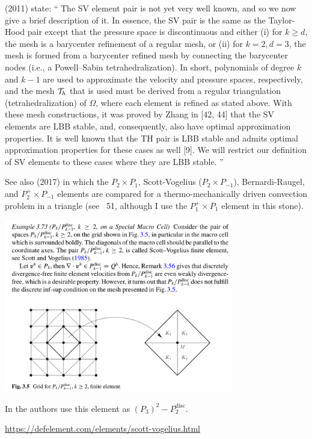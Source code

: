 \textcite{cael11} (2011) state:
``
The SV element pair is not yet very well known,
and so we now give a brief description of it. In essence, the SV pair is the same as
the Taylor-Hood pair except that the pressure space is discontinuous and either
(i) for $k \ge d$, the mesh is a barycenter reﬁnement of a regular mesh, or
(ii) for $k = 2, d = 3$, the mesh is formed from a barycenter reﬁned mesh by
connecting the barycenter nodes (i.e., a Powell–Sabin tetrahedralization).
In short, polynomials of degree $k$ and $k-1$ are used to approximate the velocity
and pressure spaces, respectively, and the mesh ${\cal T}_h$ that is used must be derived from
a regular triangulation (tetrahedralization) of $\Omega$, where each element is reﬁned as
stated above. With these mesh constructions, it was proved by Zhang in [42, 44] that
the SV elements are LBB stable, and, consequently, also have optimal approximation
properties. It is well known that the TH pair is LBB stable and admits optimal
approximation properties for these cases as well [9]. We will restrict our deﬁnition of
SV elements to these cases where they are LBB stable.
''



See also \textcite{jolm17} (2017) in which the $P_2\times P_1$, Scott-Vogelius ($P_2\times P_{-1}$), 
Bernardi-Raugel, and $P_2^+\times P_{-1}$ elements 
are compared for a thermo-mechanically driven convection problem in a triangle (see \stone~51, 
although I use the $P_1^+\times P_1$ element in this stone).


\begin{center}
\includegraphics[width=10cm]{images/pair_scott_vogelius/john_scott_vogelius}\\
\end{center}


In \cite{befh21} the authors use this element as $(P_3)^2-P_2^{\text{disc}}$.

\url{https://defelement.com/elements/scott-vogelius.html}

